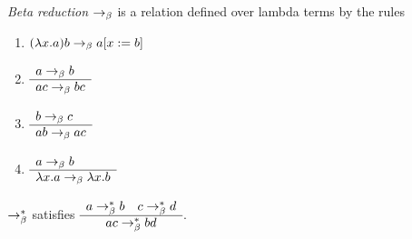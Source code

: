 \begin{definition} \emph{Beta reduction} $\to_\beta$ is a relation defined over lambda
  terms by the rules
  \begin{enumerate}
  \item $(\lambda x.a) b \to_\beta a[x := b]$
  \item $\begin{array}{l} a\to_\beta b \\ \hline a c \to_\beta b c\end{array}$
  \item $\begin{array}{l} b\to_\beta c \\ \hline a b \to_\beta a c\end{array}$
  \item $\begin{array}{l} a \to_\beta b \\ \hline \lambda x.a \to_\beta \lambda x.b\end{array}$
  \end{enumerate}
\end{definition}







\begin{theorem}
  $\to^*_\beta$ satisfies
  $\begin{array}{c} 
    a\to^*_\beta b \quad
    c \to^*_\beta d \\ \hline ac \to^*_\beta bd\end{array}$.


\end{theorem}
